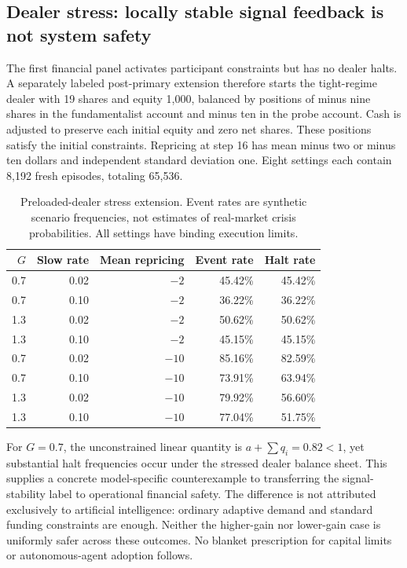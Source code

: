 \subsection{Dealer stress: locally stable signal feedback is not system safety}
The first financial panel activates participant constraints but has no dealer halts. A separately labeled post-primary extension therefore starts the tight-regime dealer with 19 shares and equity 1,000, balanced by positions of minus nine shares in the fundamentalist account and minus ten in the probe account. Cash is adjusted to preserve each initial equity and zero net shares. These positions satisfy the initial constraints. Repricing at step 16 has mean minus two or minus ten dollars and independent standard deviation one. Eight settings each contain 8,192 fresh episodes, totaling 65,536.

\begin{table}[htbp]
\centering\small
\caption{Preloaded-dealer stress extension. Event rates are synthetic scenario frequencies, not estimates of real-market crisis probabilities. All settings have binding execution limits.}
\label{tab:dealer_stress}
\begin{tabular}{r r r r r}
\toprule
$G$ & Slow rate & Mean repricing & Event rate & Halt rate\\
\midrule
0.7 & 0.02 & $-2$ & 45.42\% & 45.42\%\\
0.7 & 0.10 & $-2$ & 36.22\% & 36.22\%\\
1.3 & 0.02 & $-2$ & 50.62\% & 50.62\%\\
1.3 & 0.10 & $-2$ & 45.15\% & 45.15\%\\
0.7 & 0.02 & $-10$ & 85.16\% & 82.59\%\\
0.7 & 0.10 & $-10$ & 73.91\% & 63.94\%\\
1.3 & 0.02 & $-10$ & 79.92\% & 56.60\%\\
1.3 & 0.10 & $-10$ & 77.04\% & 51.75\%\\
\bottomrule
\end{tabular}
\end{table}

For $G=0.7$, the unconstrained linear quantity is $a+\sum q_i=0.82<1$, yet substantial halt frequencies occur under the stressed dealer balance sheet. This supplies a concrete model-specific counterexample to transferring the signal-stability label to operational financial safety. The difference is not attributed exclusively to artificial intelligence: ordinary adaptive demand and standard funding constraints are enough. Neither the higher-gain nor lower-gain case is uniformly safer across these outcomes. No blanket prescription for capital limits or autonomous-agent adoption follows.

